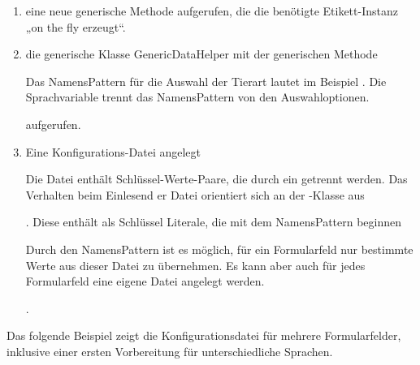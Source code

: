 \documentclass[letterpaper,10pt,ngerman]{sphinxmanual}
\begin{document}
\begin{enumerate}
\item {} 
eine neue generische Methode  aufgerufen, die die benötigte Etikett-Instanz „on the fly erzeugt“.

\item {} 
die generische Klasse GenericDataHelper mit der generischen Methode  %
\begin{footnote}[1]\sphinxAtStartFootnote
Das NamensPattern für die Auswahl der Tierart lautet im Beispiel . Die Sprachvariable trennt das NamensPattern von den Auswahloptionen.
%
\end{footnote}  aufgerufen.

\item {} 
Eine Konfigurations-Datei  angelegt %
\begin{footnote}[2]\sphinxAtStartFootnote
Die Datei enthält Schlüssel-Werte-Paare, die durch ein \sphinxcode{\sphinxupquote{=}} getrennt werden. Das Verhalten beim Einlesend er Datei orientiert sich an der -Klasse aus 
%
\end{footnote}. Diese enthält als Schlüssel Literale, die mit dem NamensPattern beginnen %
\begin{footnote}[3]\sphinxAtStartFootnote
Durch den NamensPattern ist es möglich, für ein Formularfeld nur bestimmte Werte aus dieser Datei zu übernehmen. Es kann aber auch für jedes Formularfeld eine eigene Datei angelegt werden.
%
\end{footnote}.

\end{enumerate}

Das folgende Beispiel zeigt die Konfigurationsdatei für mehrere Formularfelder, inklusive einer ersten Vorbereitung für unterschiedliche Sprachen.
\end{document}
